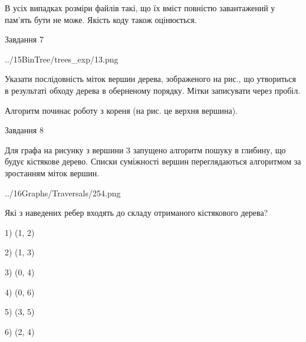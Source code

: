 \documentclass[12pt, ukrainian]{article}
\begin{document}
{В усіх випадках розміри файлів такі, що їх вміст повністю завантажений у пам'ять бути не може. Якість коду також оцінюється.



\vspace{10mm}\par

\newpage
\begin{minipage}[t]{9.7cm}
               
{\begin{center}Завдання {7}\end{center}}
\vspace{-4mm}

\begin{center}
	{../15BinTree/trees_exp/13.png}
\end{center}
Указати послідовність міток вершин дерева, зображеного на рис., що утвориться в результаті обходу дерева в оберненому порядку. Мітки записувати через пробіл.\par Алгоритм починає роботу з кореня (на рис. це верхня вершина).\par

\end{minipage}
\vline \hspace{8mm}
\begin{minipage}[t]{8.0cm}
               
{\begin{center}Завдання {8}\end{center}}
\vspace{-4mm}
Для графа на рисунку з вершини 3 запущено алгоритм пошуку в глибину, що будує кістякове дерево. Списки суміжності вершин переглядаються алгоритмом за зростанням міток вершин.\par
\begin{center}
	{../16Graphs/Traversals/254.png}
\end{center}
\par Які з наведених ребер входять до складу отриманого кістякового дерева?\par
1) (1, 2)\par
2) (1, 3)\par
3) (0, 4)\par
4) (0, 6)\par
5) (3, 5)\par
6) (2, 4)\par
{\vskip 15pt} \par


\end{minipage}}
\end{document}
